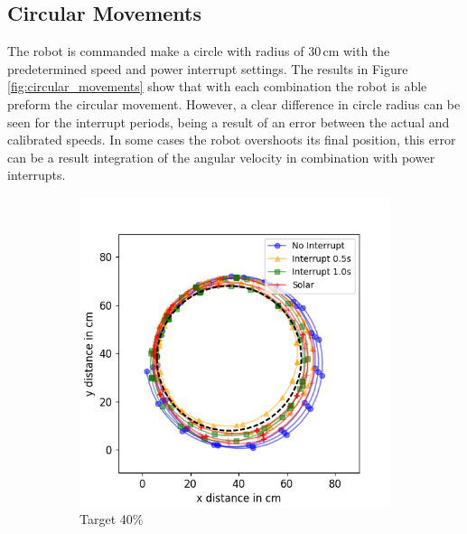 \subsection{Circular Movements}

The robot is commanded make a circle with radius of 30\,cm with the predetermined speed and power interrupt settings.
The results in Figure \ref{fig:circular_movements} show that with each combination the robot is able preform the circular movement.
However, a clear difference in circle radius can be seen for the interrupt periods, being a result of an error between the actual and calibrated speeds.
In some cases the robot overshoots its final position, this error can be a result integration of the angular velocity in combination with power interrupts.

\begin{figure}[h!]
	\centering
	\begin{subfigure}[b]{0.49\textwidth}
		\includegraphics[width=\textwidth]{pics/circle_40.png}
		\caption{Target 40\%}
		\label{fig:circ_exp1}
	\end{subfigure}
	\begin{subfigure}[b]{0.49\textwidth}

\end{subfigure}
\end{figure}
